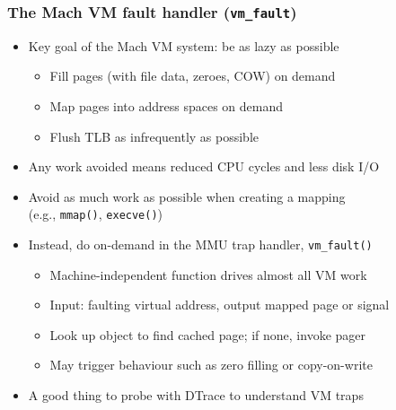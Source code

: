 \begin{frame}
  \frametitle{The Mach VM fault handler (\texttt{vm\_fault})}

  \begin{itemize}
    \item Key goal of the Mach VM system: be as lazy as possible
    \begin{itemize}
      \item Fill pages (with file data, zeroes, COW) on demand
      \item Map pages into address spaces on demand
      \item Flush TLB as infrequently as possible
    \end{itemize}
    \item Any work avoided means reduced CPU cycles and less disk I/O
    \item Avoid as much work as possible when creating a mapping \\
      (e.g., \texttt{mmap()}, \texttt{execve()})

    \pause
    \bigskip
    \item Instead, do on-demand in the MMU trap handler, \texttt{vm\_fault()}
    \begin{itemize}
      \item Machine-independent function drives almost all VM work
      \item Input: faulting virtual address, output mapped page or signal
      \item Look up object to find cached page; if none, invoke pager
      \item May trigger behaviour such as zero filling or copy-on-write
    \end{itemize}

    \pause
    \bigskip
    \item A good thing to probe with DTrace to understand VM traps
  \end{itemize}
\end{frame}

